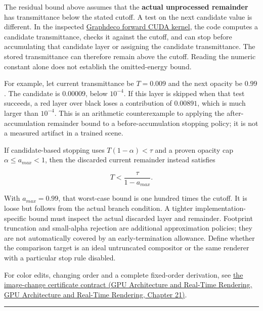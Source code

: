 The residual bound above assumes that the \textbf{actual unprocessed remainder} has transmittance below the stated cutoff. A test on the next candidate value is different. In the inspected \href{https://github.com/graphdeco-inria/diff-gaussian-rasterization/blob/main/cuda_rasterizer/forward.cu}{Graphdeco forward CUDA kernel}, the code computes a candidate transmittance, checks it against the cutoff, and can stop before accumulating that candidate layer or assigning the candidate transmittance. The stored transmittance can therefore remain above the cutoff. Reading the numeric constant alone does not establish the omitted-energy bound.

For example, let current transmittance be \(T=0.009\) and the next opacity be \(0.99\). The candidate is \(0.00009\), below \(10^{-4}\). If this layer is skipped when that test succeeds, a red layer over black loses a contribution of \(0.00891\), which is much larger than \(10^{-4}\). This is an arithmetic counterexample to applying the after-accumulation remainder bound to a before-accumulation stopping policy; it is not a measured artifact in a trained scene.

If candidate-based stopping uses \(T(1-\alpha)<\tau\) and a proven opacity cap \(\alpha\le a_{max}<1\), then the discarded current remainder instead satisfies

\[
T<\frac{\tau}{1-a_{max}}.
\]

With \(a_{max}=0.99\), that worst-case bound is one hundred times the cutoff. It is loose but follows from the actual branch condition. A tighter implementation-specific bound must inspect the actual discarded layer and remainder. Footprint truncation and small-alpha rejection are additional approximation policies; they are not automatically covered by an early-termination allowance. Define whether the comparison target is an ideal untruncated compositor or the same renderer with a particular stop rule disabled.

For color edits, changing order and a complete fixed-order derivation, see \href{../06-GPU-Architecture-and-Real-Time-Rendering/main.pdf\#nameddest=06-engine-ii-ch045-an-image-change-certificate-must-name-the-edits-it-covers}{the image-change certificate contract (GPU Architecture and Real-Time Rendering, GPU Architecture and Real-Time Rendering, Chapter 21)}.

\begin{center}\rule{0.5\linewidth}{0.5pt}\end{center}

